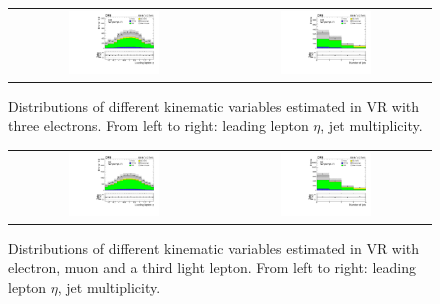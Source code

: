 \begin{figure}[tbh!]
 \begin{center}
 \begin{tabular}{cc}
 \includegraphics[width=0.45\textwidth]{figures/Part3/Nonprompt/VR/eee/lep1Eta}&
 \includegraphics[width=0.45\textwidth]{figures/Part3/Nonprompt/VR/eee/njet} \\
 \end{tabular}
 \caption{Distributions of different kinematic variables estimated in VR with three electrons. From left to right: leading lepton $\eta$, jet multiplicity.}
 \label{fig:VR_matrix_eee}
 \end{center}
\end{figure}

\begin{figure}[tbh!]
 \begin{center}
 \begin{tabular}{cc}
  \includegraphics[width=0.45\textwidth]{figures/Part3/Nonprompt/VR/emul/lep1Eta}&
 \includegraphics[width=0.45\textwidth]{figures/Part3/Nonprompt/VR/emul/njet} \\
 \end{tabular}
 \caption{Distributions of different kinematic variables estimated in VR with electron, muon and a third light lepton. From left to right: leading lepton $\eta$, jet multiplicity.}
 \label{fig:VR_matrix_emul}
 \end{center}
\end{figure}

